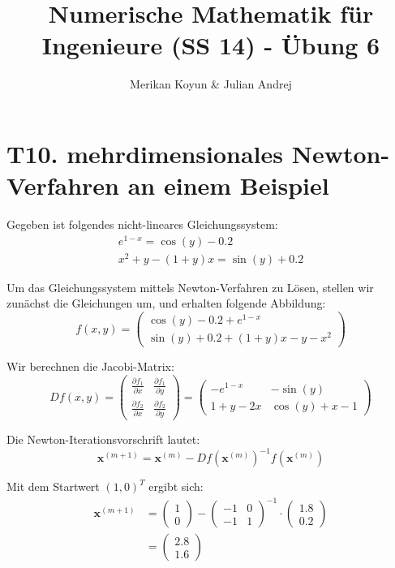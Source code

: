 \documentclass[11pt]{article}
\theoremstyle{plain}
\theoremstyle{definition}
\let\mbb\boldsymbol
\renewcommand\boldsymbol{\mbb}
\renewcommand{\a}{\"{a}}
\renewcommand{\o}{\"{o}}
\renewcommand{\u}{\"{u}}
\begin{document}
\title{Numerische Mathematik f\u r Ingenieure (SS 14) - \"{U}bung 6}
\author{Merikan Koyun \& Julian Andrej}
\maketitle

\section*{T10. mehrdimensionales Newton-Verfahren an einem Beispiel}
Gegeben ist folgendes nicht-lineares Gleichungssystem:
\begin{align}
e^{1-x} = \cos(y)-0.2 \\
x^2+y-(1+y)x = \sin(y)+0.2
\end{align}

Um das Gleichungssystem mittels Newton-Verfahren zu L\o sen, stellen wir zun\a chst die Gleichungen um, und erhalten folgende Abbildung:
\begin{equation}
f(x,y) = 
\begin{pmatrix}
\cos(y) - 0.2 + e^{1-x} \\
\sin(y) + 0.2 + (1+y)x - y -x^2
\end{pmatrix}
\end{equation}

Wir berechnen die Jacobi-Matrix:
\begin{equation}
Df(x,y) =
\begin{pmatrix}
\frac{\partial f_1}{\partial x} & \frac{\partial f_1}{\partial y} \\
\frac{\partial f_2}{\partial x} & \frac{\partial f_2}{\partial y}
\end{pmatrix}
=
\begin{pmatrix}
-e^{1-x} & -\sin(y) \\ 
1+y-2x & \cos(y)+x-1
\end{pmatrix}
\end{equation}

Die Newton-Iterationsvorschrift lautet:
\begin{equation}
\mbb{x}^{(m+1)} = \mbb{x}^{(m)} - Df(\mbb{x}^{(m)})^{-1} f(\mbb{x}^{(m)})
\end{equation}

Mit dem Startwert $(1, 0)^T$ ergibt sich:
\begin{align*}
\mbb{x}^{(m+1)} &= 
\begin{pmatrix}
1 \\ 0
\end{pmatrix}
- 
\begin{pmatrix}
-1 & 0 \\ -1 & 1
\end{pmatrix}
^{-1}
\cdot
\begin{pmatrix}
1.8 \\ 0.2
\end{pmatrix} \\
&=
\begin{pmatrix}
2.8 \\ 1.6
\end{pmatrix}
\end{align*}
\end{document}
